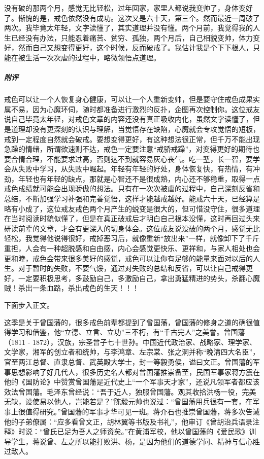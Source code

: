 \begin{case}
    没有破的那两个月，感觉无比轻松，过年回家，家里人都说我变帅了，身体变好了。惭愧的是，戒色依然没有成功。这次又是六十天，第三个。然而最近一周破了两次。我毕竟太年轻，文字读懂了，其实道理并没有懂。两个月前，我觉得我的人生已经没有办法，只能忍着痛苦、贫穷、孤独，两个月后，自己相貌变帅，体力变好，然而自己又想变得更好，这个时候，反而破戒了。我估计我是个下下根人，只能在被生活一次次虐的过程中，略微领悟点道理。
    \subparagraph{附评} 戒色可以让一个人恢复身心健康，可以让一个人重新变帅，但是要守住戒色成果实属不易，因为心魔环伺，随时都准备进行激烈的反扑，企图再次控制你。这位戒友说自己毕竟太年轻，对戒色文章的内容还没有真正吸收内化，虽然文字读懂了，但是道理却没有更深刻的认识与理解，当觉悟存在缺陷，心魔就会专攻觉悟的短板，戒到一定程度自然就会破戒。要想变得更好，有这种想法很正常，但千万不能出现急躁的情绪，所谓欲速则不达，戒色一定要注意“戒骄戒躁”，对变得更好的期待也要合情合理，不能要求过高，否则达不到就容易灰心丧气。吃一堑，长一智，要学会从失败中学习，从失败中崛起。年轻有年轻的好处，身体恢复快，有热情，有冲劲，年轻也有年轻的缺点，那就是心智还不是很成熟，内心还不够稳重，取得一点戒色成绩就可能会出现骄傲的想法。只有在一次次被虐的过程中，自己深刻反省和总结，不断加强学习补强和完善觉悟，这样才能越戒越好。能戒六十天，已经算是略有小成了，这位戒友戒色两个月产生的蜕变是很大的，但可惜没守住，很多道理在当时阅读时貌似懂了，但是在真正破戒后才明白自己根本没懂，这时再回过头来研读前辈的文章，才会有更深入的切身体会。这位戒友说没破的两个月，感觉无比轻松，我觉得他说得很好，戒掉恶习后，就像重新“放出来”一样，就像卸下了千斤重担，人会有一种超脱感和自由感，内心会感觉更快乐、更祥和，与家人相处也会更和睦，戒色会带来很多美好的感觉，戒色可以让你有足够的能量来面对以后的人生。对于暂时的失败，不要气馁，通过对失败的总结和反省，可以让自己戒得更好，一定要积极思考，多鼓励自己，多激励自己，拿出勇猛精进的势头，杀翻心魔贼！杀出一条血路，杀出戒色的生天！！！
\end{case}

下面步入正文。

这季是关于曾国藩的，很多戒色前辈都提到了曾国藩，曾国藩的修身之道的确很值得学习和借鉴，他“立德、立言、立功”三不朽，有“千古完人”之美誉。曾国藩（1811 - 1872），汉族，宗圣曾子七十世孙。中国近代政治家、战略家、理学家、文学家，湘军的创立者和统帅，与李鸿章、左宗棠、张之洞并称“晚清四大名臣”，官至两江总督、直隶总督、武英殿大学士，封一等毅勇侯，谥曰文正。曾国藩的军事思想影响了好几代人，很多历史名人都对曾国藩推崇备至，民国军事家蒋方震在他的《国防论》中赞赏曾国藩是近代史上“一个军事天才家”，还说凡领军者都应该效法曾国藩。毛泽东曾经说：“吾于近人，独服曾国藩。观其收拾洪杨一役，完美无缺，设使易以他人，岂能若是？”陈毅元帅也说过：“曾国藩用兵很有一套，在军事上很值得研究。”曾国藩的军事才华可见一斑。蒋介石也推崇曾国藩，蒋多次告诫他的子弟僚属：“应多看曾文正，胡林翼等书版及书礼”，他审订《曾胡治兵语录注释》时说：“曾氏已足为吾人之师资矣。”在黄浦军校，他以曾国藩的《爱民歌》训导学生，蒋说曾、左之所以能打败洪、杨，是因为他们的道德学问、精神与信心胜过敌人。

